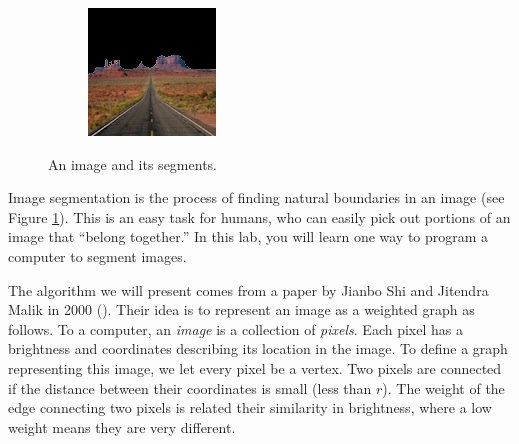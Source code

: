 \begin{figure}
\begin{subfigure}{0.31\textwidth}
    \end{subfigure}
    \hspace*{\fill}
    \begin{subfigure}{0.31\textwidth}
        \includegraphics[width=\textwidth]{PosMon.png}
    \end{subfigure}
    
\caption{An image and its segments.}
\label{fig:monument}
\end{figure}
Image segmentation is the process of finding natural boundaries in an image (see Figure \ref{fig:monument}).
This is an easy task for humans, who can easily pick out portions of an image that ``belong together.''
In this lab, you will learn one way to program a computer to segment images.

The algorithm we will present comes from a paper by Jianbo Shi and Jitendra Malik in 2000 (\cite{Shi2000}).
Their idea is to represent an image as a weighted graph as follows. 
To a computer, an \emph{image} is a collection of \emph{pixels}. 
Each pixel has a brightness and coordinates describing its location in the image.
To define a graph representing this image, we let every pixel be a vertex.
Two pixels are connected if the distance between their coordinates is small (less than $r$).
The weight of the edge connecting two pixels is related their similarity in brightness, where a low weight means they are very different.

